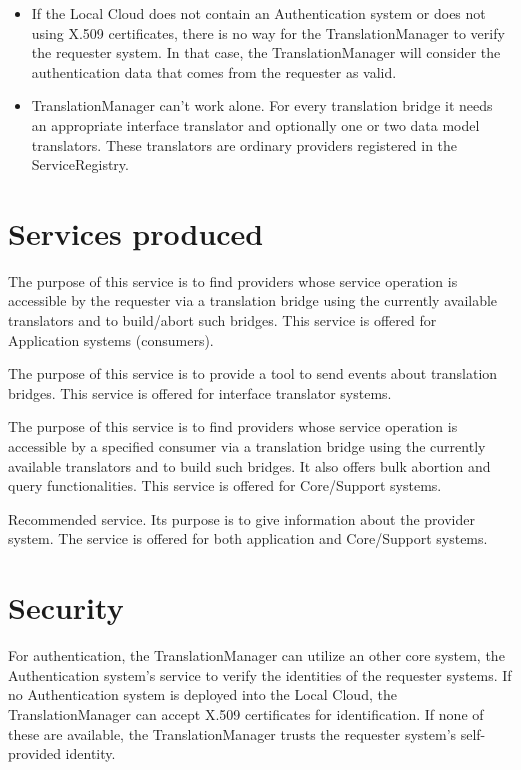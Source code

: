 \documentclass[a4paper]{arrowhead}
\begin{document}
\begin{itemize}
    \item If the Local Cloud does not contain an Authentication system or does not using X.509 certificates, there is no way for the TranslationManager to verify the requester system. In that case, the TranslationManager will consider the authentication data that comes from the requester as valid.
    \item TranslationManager can't work alone. For every translation bridge it needs an appropriate 
    interface translator and optionally one or two data model translators. These translators are ordinary providers registered in the ServiceRegistry.
\end{itemize}

\newpage

\section{Services produced}
\label{sec:services}

{}
The purpose of this service is to find providers whose service operation is accessible by the requester via a translation bridge using the currently available translators and to build/abort such bridges. This service is offered for Application systems (consumers). 

The purpose of this service is to provide a tool to send events about translation bridges. This service is offered for interface translator systems.

The purpose of this service is to find providers whose service operation is accessible by a specified consumer via a translation bridge using the currently available translators and to build such bridges. It also offers bulk abortion and query functionalities. This service is offered for Core/Support systems.

Recommended service. Its purpose is to give information about the provider system. The service is offered for both application and Core/Support systems.

\newpage

\section{Security}
\label{sec:security}

For authentication, the TranslationManager can utilize an other core system, the Authentication system's service to verify the identities of the requester systems. If no Authentication system is deployed into the Local Cloud, the TranslationManager can accept X.509 certificates for identification. If none of these are available, the TranslationManager trusts the requester system's self-provided identity.
\end{document}
